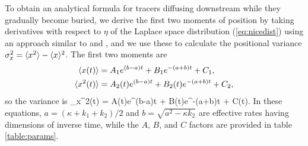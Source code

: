To obtain an analytical formula for tracers diffusing downstream while they gradually become buried, we derive the first two moments of position by taking derivatives with respect to $\eta$ of the Laplace space distribution (\ref{eq:nicedist}) using an approach similar to \citet{Shlesinger1974} and \citet{Weeks1998}, and we use these to calculate the positional variance $\sigma_x^2 = \langle x^2\rangle - \langle x \rangle^2$. 
The first two moments are
\begin{align}
	\langle x(t) \rangle &= A_1 e^{(b-a)t}+B_1e^{-(a+b)t}+C_1, \label{eq:mean}\\
	\langle x^2(t) \rangle &= A_2(t)e^{(b-a)t}+B_2(t)e^{-(a+b)t}+C_2, \label{eq:second}
\end{align}
so the variance is 
\be \sigma_x^2(t) = A(t)e^{(b-a)t} + B(t)e^{-(a+b)t} + C(t). \label{eq:var}\ee
In these equations, $a = (\kappa + k_1+k_2)/2$ and $b = \sqrt{a^2-\kappa k_2}$ are effective rates having dimensions of inverse time, while the $A$, $B$, and $C$ factors are provided in table \ref{table:params}.

